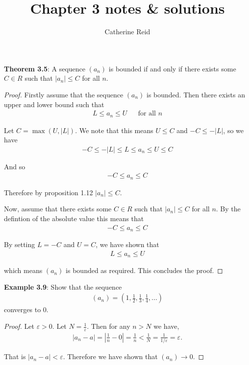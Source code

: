 \documentclass{article}
\author{Catherine Reid}
\title{Chapter 3 notes \& solutions}
\date{}
\begin{document}
\maketitle

\textbf{Theorem 3.5}: A sequence $(a_n)$ is bounded if and only if there exists some $C \in R$ such that $|a_n| \leq C$ for all $n$.

\begin{proof}
	Firstly assume that the sequence $(a_n)$ is bounded. Then there exists an upper and lower bound such that
	\begin{align*}
		L \leq a_n \leq U &  & \text{for all }n
	\end{align*}

	Let $C = \max(U, |L|)$. We note that this means $U \leq C$ and $-C \leq -|L|$, so we have
	\begin{align*}
		-C \leq -|L| \leq L \leq a_n \leq U \leq C
	\end{align*}

	And so
	\begin{align*}
		-C \leq a_n \leq C
	\end{align*}

	Therefore by proposition 1.12 $|a_n| \leq C$.

	Now, assume that there exists some $C \in R$ such that $|a_n| \leq C$ for all $n$.  By the defintion of the absolute value this means that
	\begin{align*}
		-C \leq a_n \leq C
	\end{align*}

	By setting $L = -C$ and $U = C$, we have shown that
	\begin{align*}
		L \leq a_n \leq U
	\end{align*}

	which means $(a_n)$ is bounded as required. This concludes the proof.
\end{proof}

\textbf{Example 3.9}: Show that the sequence
\begin{align*}
	(a_n) = \left(1, \frac{1}{2}, \frac{1}{3}, \frac{1}{4},...\right)
\end{align*}
converges to 0.

\begin{proof}
	Let $\varepsilon > 0$. Let $N = \tfrac{1}{\varepsilon}$. Then for any $n > N$ we have,
	\begin{align*}
		|a_n - a| = |\frac{1}{n} - 0| = \frac{1}{n} < \frac{1}{N} = \frac{1}{1/\varepsilon} = \varepsilon.
	\end{align*}

	That is $|a_n - a| < \varepsilon$. Therefore we have shown that $(a_n) \rightarrow 0$.
\end{proof}
\end{document}
